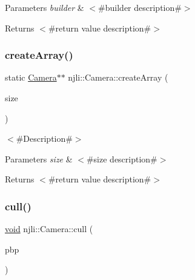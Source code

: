 \begin{DoxyParams}{Parameters}
{\em builder} & $<$\#builder description\#$>$\\
\hline
\end{DoxyParams}
\begin{DoxyReturn}{Returns}
$<$\#return value description\#$>$ 
\end{DoxyReturn}
\mbox{\label{classnjli_1_1_camera_a896d192b1e16dde947082d245f63787d}} 
\subsubsection{\texorpdfstring{create\+Array()}{createArray()}}
{\footnotesize\ttfamily static \mbox{\hyperlink{classnjli_1_1_camera}{Camera}}$\ast$$\ast$ njli\+::\+Camera\+::create\+Array (\begin{DoxyParamCaption}\item[{const \mbox{\hyperlink{_util_8h_a10e94b422ef0c20dcdec20d31a1f5049}{u32}}}]{size }\end{DoxyParamCaption})\hspace{0.3cm}{\ttfamily [static]}}

$<$\#\+Description\#$>$


\begin{DoxyParams}{Parameters}
{\em size} & $<$\#size description\#$>$\\
\hline
\end{DoxyParams}
\begin{DoxyReturn}{Returns}
$<$\#return value description\#$>$ 
\end{DoxyReturn}
\mbox{\label{classnjli_1_1_camera_a9919eed4f61256bb04551ac64d6aadcf}} 
\subsubsection{\texorpdfstring{cull()}{cull()}}
{\footnotesize\ttfamily \mbox{\hyperlink{_thread_8h_af1e856da2e658414cb2456cb6f7ebc66}{void}} njli\+::\+Camera\+::cull (\begin{DoxyParamCaption}\item[{bt\+Dbvt\+Broadphase $\ast$}]{pbp }\end{DoxyParamCaption})\hspace{0.3cm}{\ttfamily [protected]}}

